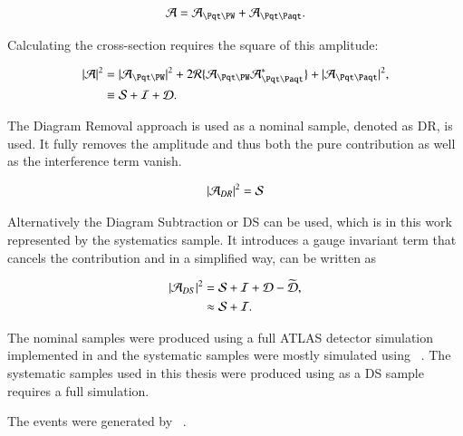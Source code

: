 \begin{align}
\Aamp = \Atw + \Att.
\end{align}

Calculating the cross-section requires the square of this amplitude:

\begin{align}
|\Aamp|^2 &= |\Atw|^2 + 2 \mathcal{R} \{ \Atw \Att^{\ast} \} + |\Att|^2, \\
&\equiv \Samp + \Iamp + \Damp.
\end{align}

The Diagram Removal approach is used as a nominal sample, denoted as DR, is used. It fully removes the \Att amplitude and thus both the pure \ttbar contribution as well as the interference term vanish.

\begin{align}
| \mathcal{A}_{DR} |^2 = \mathcal{S}
\end{align}

Alternatively the Diagram Subtraction or DS can be used, which is in this work represented by the systematics sample. It introduces a gauge invariant term that cancels the \ttbar contribution and in a simplified way, can be written as

\begin{align}
| \mathcal{A}_{DS} |^2 &= \mathcal{S} + \mathcal{I} + \mathcal{D} - \widetilde{\mathcal{D}},\\
&\approx \mathcal{S} + \mathcal{I}.
\end{align}

The nominal samples were produced using a full ATLAS detector simulation implemented in \GEANTfour and the systematic samples were mostly simulated using \ATLFASTtwo~\cite{geant, atlfast}. The systematic samples used in this thesis were produced using \GEANTfour as a DS sample requires a full simulation.

The events were generated by \POWHEG{}~\cite{pythia}.

